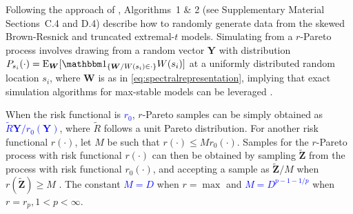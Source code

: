 \documentclass[12pt]{article}
\newcommand{\PZ}{\textcolor{blue}}
\begin{document}
Following the approach of \citet{Dombry.Engelke.Oesting:2016},
Algorithms~1 \& 2 (see Supplementary Material Sections~C.4 and D.4) describe how to randomly generate data from the skewed Brown-Resnick and truncated extremal-$t$ models. 
%
Simulating from a $r$-Pareto process 
involves drawing from a random vector $\bm Y$ with distribution $P_{s_i}(\cdot) = \E_{\bm W}[\mathbbm 1_{\{\bm W/W(s_i)\in \cdot\}}W(s_i)]$ at a uniformly distributed random location $s_i$, where $\bm W$ is as in \eqref{eq:spectralrepresentation}, implying that
%
exact simulation algorithms for max-stable models can be leveraged \citep{Dombry.Engelke.Oesting:2016,Dombry.etal:2024}.  
%

When the risk functional is \PZ{$r_0$}, $r$-Pareto samples can be simply obtained as \PZ{$\tilde R\bm Y/r_0(\bm Y)$}, where $\tilde R$ follows a unit Pareto distribution.  
For another risk functional $r(\cdot)$, let $M$ be such that
$r(\cdot) \leq Mr_0 (\cdot)$.
%
Samples for the $r$-Pareto process with risk functional $r(\cdot)$ can then be obtained by sampling $\bm{\tilde Z}$ from the process with risk functional $r_0(\cdot)$, 
and accepting a sample as $\bm{\tilde Z}/M$ when $r(\bm {\tilde Z})\geq M$ \citep[Proposition 2]{Dombry.etal:2024}. The constant \PZ{$M=D$} when $r=\max$ and \PZ{$M=D^{p-1-1/p}$} when $r=r_p, 1<p<\infty$.
\end{document}
